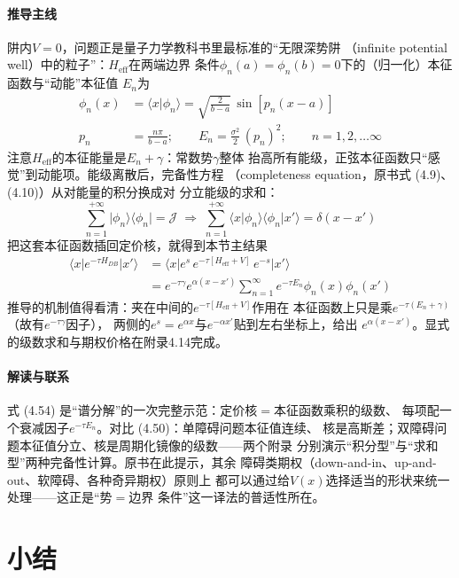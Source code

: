 \paragraph{推导主线}
阱内$V=0$，问题正是量子力学教科书里最标准的“无限深势阱
（infinite potential well）中的粒子”：$H_{\mathrm{eff}}$在两端边界
条件$\phi_n(a)=\phi_n(b)=0$下的（归一化）本征函数与“动能”本征值
$E_n$为
\begin{align*}
\phi_n(x)&=\langle x\vert\phi_n\rangle=\sqrt{\frac{2}{b-a}}\,
\sin[p_n(x-a)]\\
p_n&=\frac{n\pi}{b-a};\qquad
E_n=\frac{\sigma^{2}}{2}\,(p_n)^{2};\qquad
n=1,2,\ldots\infty
\end{align*}
注意$H_{\mathrm{eff}}$的本征能量是$E_n+\gamma$：常数势$\gamma$整体
抬高所有能级，正弦本征函数只“感觉”到动能项。能级离散后，完备性方程
（completeness equation，原书式 (4.9)、(4.10)）从对能量的积分换成对
分立能级的求和：
\begin{equation*}
\sum_{n=1}^{+\infty}\vert\phi_n\rangle\langle\phi_n\vert=\mathcal{J}
\;\Rightarrow\;
\sum_{n=1}^{+\infty}\langle x\vert\phi_n\rangle\langle\phi_n\vert x'\rangle
=\delta(x-x')
\end{equation*}
把这套本征函数插回定价核，就得到本节主结果
\begin{align*}
\langle x\vert e^{-\tau H_{DB}}\vert x'\rangle
&=\langle x\vert e^{s}\,e^{-\tau[H_{\mathrm{eff}}+V]}\,e^{-s}\vert x'\rangle\\
&=e^{-\tau\gamma}e^{\alpha(x-x')}\sum_{n=1}^{\infty}e^{-\tau E_n}
\phi_n(x)\phi_n(x')
\tag{4.54}
\end{align*}
推导的机制值得看清：夹在中间的$e^{-\tau[H_{\mathrm{eff}}+V]}$作用在
本征函数上只是乘$e^{-\tau(E_n+\gamma)}$（故有$e^{-\tau\gamma}$因子），
两侧的$e^{s}=e^{\alpha x}$与$e^{-\alpha x'}$贴到左右坐标上，给出
$e^{\alpha(x-x')}$。显式的级数求和与期权价格在附录4.14完成。

\paragraph{解读与联系}
式 (4.54) 是“谱分解”的一次完整示范：定价核$=$本征函数乘积的级数、
每项配一个衰减因子$e^{-\tau E_n}$。对比 (4.50)：单障碍问题本征值连续、
核是高斯差；双障碍问题本征值分立、核是周期化镜像的级数——两个附录
分别演示“积分型”与“求和型”两种完备性计算。原书在此提示，其余
障碍类期权（down-and-in、up-and-out、软障碍、各种奇异期权）原则上
都可以通过给$V(x)$选择适当的形状来统一处理——这正是“势$=$边界
条件”这一译法的普适性所在。

\section{小结}

